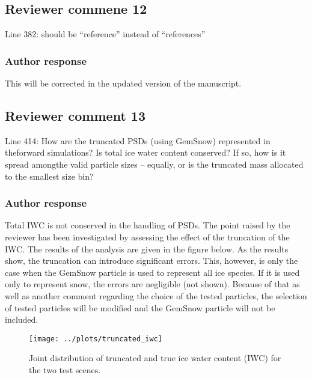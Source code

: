 \documentclass[11pt]{scrartcl}
\begin{document}
\subsection*{Reviewer commene 12}
 Line 382: should be “reference” instead of “references”

\subsubsection*{Author response}
This will be corrected in the updated version of the manuscript.

\subsection*{Reviewer comment 13}

Line  414:  How  are  the  truncated  PSDs  (using  GemSnow)  represented  in  theforward simulations? Is total ice water content conserved? If so, how is it spread amongthe valid particle sizes – equally, or is the truncated mass allocated to the smallest size bin?

\subsubsection*{Author response}
Total IWC is not conserved in the handling of PSDs. The point raised by the reviewer has been
investigated by assessing the effect of the truncation of the IWC. The results of the analysis
are given in the figure below. As the results show, the truncation can introduce significant
errors. This, however, is only the case when the GemSnow particle is used to represent all
ice species. If it is used only to represent snow, the errors are negligible (not shown). Because
of that as well as another comment regarding the choice of the tested particles, the selection of
tested particles will be modified and the GemSnow particle will not be included.

\begin{figure}[!hbpt]
  \centering
  \texttt{[image: ../plots/truncated\_iwc]}
  \caption{Joint distribution of truncated and true ice water content (IWC) for the
    two test scenes.}
\end{figure}
\end{document}
